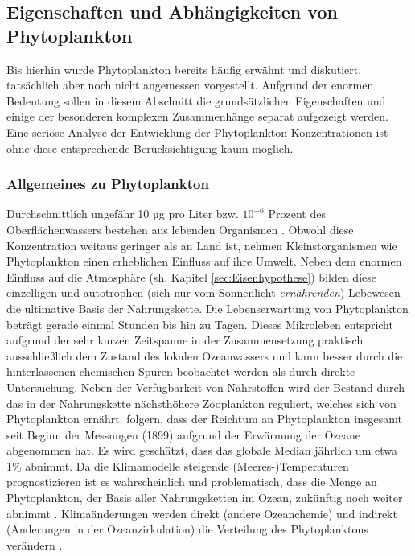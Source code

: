\documentclass[12pt,a4paper,onecolumn]{scrartcl}
\begin{document}
\subsection{Eigenschaften und Abhängigkeiten von Phytoplankton} \label{sec:Phytoplankton}
Bis hierhin wurde Phytoplankton bereits häufig erwähnt und diskutiert, tatsächlich aber noch nicht angemessen vorgestellt. Aufgrund der enormen Bedeutung sollen in diesem Abschnitt die grundsätzlichen Eigenschaften und einige der besonderen komplexen Zusammenhänge separat aufgezeigt werden. Eine seriöse Analyse der Entwicklung der Phytoplankton Konzentrationen ist ohne diese entsprechende Berücksichtigung kaum möglich. 
\subsubsection{Allgemeines zu Phytoplankton} \label{sec:Phytobasics}
Durchschnittlich ungefähr 10 µg pro Liter bzw. $10^{-6}$ Prozent des Oberflächenwassers bestehen aus lebenden Organismen \citep{Emerson.2009}. Obwohl diese Konzentration weitaus geringer als an Land ist, nehmen Kleinstorganismen wie Phytoplankton einen erheblichen Einfluss auf ihre Umwelt. Neben dem enormen Einfluss auf die Atmosphäre (sh. Kapitel \ref{sec:Eisenhypothese}) bilden diese einzelligen und autotrophen (sich nur vom Sonnenlicht \textit{ernährenden}) Lebewesen die ultimative Basis der Nahrungskette. Die Lebenserwartung von Phytoplankton beträgt gerade einmal Stunden bis hin zu Tagen. Dieses Mikroleben entspricht aufgrund der sehr kurzen Zeitspanne in der Zusammensetzung praktisch ausschließlich dem Zustand des lokalen Ozeanwassers und kann besser durch die hinterlassenen chemischen Spuren beobachtet werden als durch direkte Untersuchung. Neben der Verfügbarkeit von Nährstoffen wird der Bestand durch das in der Nahrungskette nächsthöhere Zooplankton reguliert, welches sich von Phytoplankton ernährt. \citet{Boyce.2010} folgern, dass der Reichtum an Phytoplankton insgesamt seit Beginn der Messungen (1899) aufgrund der Erwärmung der Ozeane abgenommen hat. Es wird geschätzt, dass das globale Median jährlich um etwa 1\% abnimmt. Da die Klimamodelle steigende (Meeres-)Temperaturen prognostizieren ist es wahrscheinlich und problematisch, dass die Menge an Phytoplankton, der Basis aller Nahrungsketten im Ozean, zukünftig noch weiter abnimmt \citep{Siegel.2010}. Klimaänderungen werden direkt (andere Ozeanchemie) und indirekt (Änderungen in der Ozeanzirkulation) die Verteilung des Phytoplanktons verändern \citep{Falkowski.1998}.  
\end{document}
